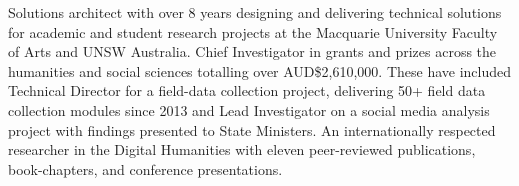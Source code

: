 
Solutions architect with over 8 years designing and delivering technical solutions for academic and student research projects at the Macquarie University Faculty of Arts and UNSW Australia. Chief Investigator in grants and prizes across the humanities and social sciences totalling over AUD\$2,610,000. These have included Technical Director for a field-data collection project, delivering 50+ field data collection modules since 2013 and Lead Investigator on a social media analysis project with findings presented to State Ministers. An internationally respected researcher in the Digital Humanities with eleven peer-reviewed publications, book-chapters, and conference presentations.


